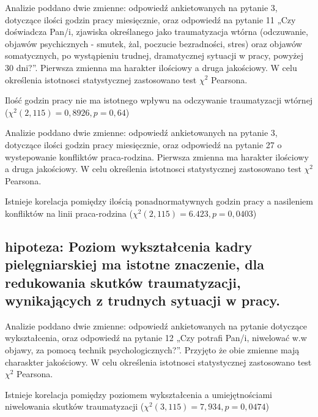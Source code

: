 \documentclass[a4paper,12pt,twoside,openany]{report}
\begin{document}
\vspace{\baselineskip} 
  

Analizie poddano dwie zmienne: odpowiedź ankietowanych na pytanie 3, dotyczące ilości godzin pracy miesięcznie, oraz odpowiedź na pytanie 11 „Czy doświadcza Pan/i, zjawiska określanego jako traumatyzacja wtórna (odczuwanie, objawów psychicznych - smutek, żal, poczucie bezradności, stres) oraz objawów somatycznych, po wystąpieniu trudnej, dramatycznej sytuacji w pracy, powyżej 30 dni?”. Pierwsza zmienna ma harakter ilościowy a druga jakościowy. W celu określenia istotnosci statystycznej zastosowano test $\chi^2$ Pearsona. 
 
Ilość godzin pracy nie ma istotnego wpływu na odczywanie traumatyzacji wtórnej ($\chi^2 (2, 115) = 0,8926, p=0,64$)

\vspace{\baselineskip} 
    
   
Analizie poddano dwie zmienne: odpowiedź ankietowanych na pytanie 3, dotyczące ilości godzin pracy miesięcznie, oraz odpowiedź na pytanie 27 o wystepowanie konfliktów praca-rodzina. Pierwsza zmienna ma harakter ilościowy a druga jakościowy. W celu określenia istotnosci statystycznej zastosowano test $\chi^2$ Pearsona.  
    
Istnieje korelacja pomiędzy ilością ponadnormatywnych godzin pracy a nasileniem konfliktów na linii praca-rodzina ($\chi^2 (2, 115) = 6.423, p=0,0403$)
  
\vspace{\baselineskip}   

\subsection*{hipoteza: Poziom wykształcenia kadry pielęgniarskiej ma istotne znaczenie, dla  redukowania skutków traumatyzacji, wynikających z trudnych sytuacji w pracy.}


Analizie poddano dwie zmienne: odpowiedź ankietowanych na pytanie dotyczące wykształcenia, oraz odpowiedź na pytanie 12 „Czy potrafi Pan/i, niwelować w.w objawy, za pomocą technik psychologicznych?”. Przyjęto że obie zmienne mają charaskter jakościowy. W celu określenia istotnosci statystycznej zastosowano test $\chi^2$ Pearsona.

Istnieje korelacja pomiędzy poziomem wykształcenia a umiejętnościami niwelowania skutków traumatyzacji ($\chi^2 (3, 115) = 7,934, p=0,0474$)

\vspace{\baselineskip} 
\end{document}
